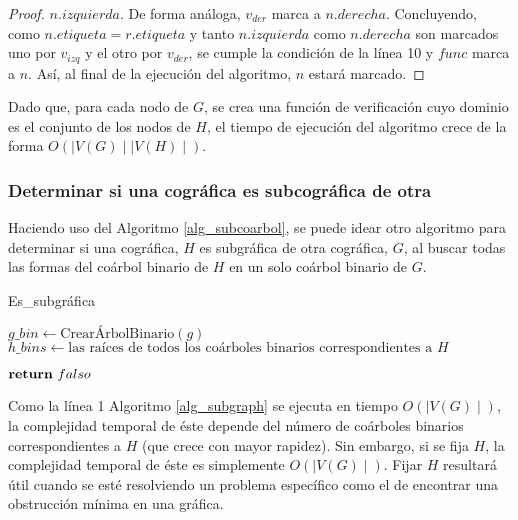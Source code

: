 \begin{proof}
$n.izquierda$. De forma análoga, $v_{der}$ marca a $n.derecha$. Concluyendo, como $n.etiqueta = r.etiqueta$ y tanto $n.izquierda$ como $n.derecha$ son marcados uno por $v_{izq}$ y el otro por $v_{der}$, se cumple la condición de la línea 10 y $func$ marca a $n$. Así, al final de la ejecución del algoritmo, $n$ estará marcado.

\end{proof}

Dado que, para cada nodo de $G$, se crea una función de verificación cuyo dominio es el conjunto de los nodos de $H$, el tiempo de ejecución del algoritmo crece de la forma $O(\mid V(G) \mid \mid V(H) \mid)$.

\subsubsection{Determinar si una cográfica es subcográfica de otra}

Haciendo uso del Algoritmo \ref{alg_subcoarbol}, se puede idear otro algoritmo para determinar si una cográfica, $H$ es subgráfica de otra cográfica, $G$, al buscar todas las formas del coárbol binario de $H$ en un solo coárbol binario de $G$.

\begin{algorithm}[ht!]
\caption{Es\_subgráfica}
\label{alg_subgraph}
\DontPrintSemicolon %

$g\_bin \gets \text{CrearÁrbolBinario}(g)$\;
$h\_bins \gets \text{las raíces de todos los coárboles binarios correspondientes a } H$\;


$\Return\ falso$\;

\end{algorithm}

Como la línea 1 Algoritmo \ref{alg_subgraph} se ejecuta en tiempo $O(\mid V(G) \mid)$, la complejidad temporal de éste depende del número de coárboles binarios correspondientes a $H$ (que crece con mayor rapidez). Sin embargo, si se fija $H$, la complejidad temporal de éste es simplemente  $O(\mid V(G) \mid)$. Fijar $H$ resultará útil cuando se esté resolviendo un problema específico como el de encontrar una obstrucción mínima en una gráfica.
